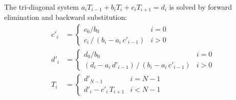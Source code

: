 The tri-diagonal system $a_i T_{i-1} + b_i T_i + c_i T_{i+1} = d_i$ is solved by forward elimination and backward substitution:
\begin{align}
  c'_i &= \begin{cases} c_0/b_0 & i = 0 \\ c_i\,/\,(b_i - a_i\,c'_{i-1}) & i > 0 \end{cases} \label{eq:tdma-c}\\
  d'_i &= \begin{cases} d_0/b_0 & i = 0 \\ (d_i - a_i\,d'_{i-1})\,/\,(b_i - a_i\,c'_{i-1}) & i > 0 \end{cases} \label{eq:tdma-d}\\
  T_i  &= \begin{cases} d'_{N-1} & i = N-1 \\ d'_i - c'_i\,T_{i+1} & i < N-1 \end{cases} \label{eq:tdma-T}
\end{align}
